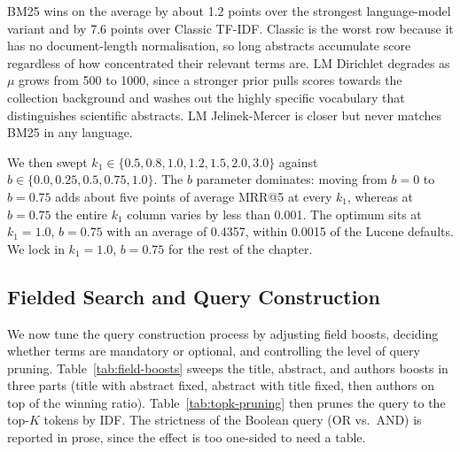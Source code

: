 BM25 wins on the average by about 1.2 points over the strongest language-model variant and by 7.6 points over Classic TF-IDF\@. Classic is the worst row because it has no document-length normalisation, so long abstracts accumulate score regardless of how concentrated their relevant terms are. LM Dirichlet degrades as $\mu$ grows from 500 to 1000, since a stronger prior pulls scores towards the collection background and washes out the highly specific vocabulary that distinguishes scientific abstracts. LM Jelinek-Mercer is closer but never matches BM25 in any language.

We then swept $k_1 \in \{0.5, 0.8, 1.0, 1.2, 1.5, 2.0, 3.0\}$ against $b \in \{0.0, 0.25, 0.5, 0.75, 1.0\}$. The $b$ parameter dominates: moving from $b{=}0$ to $b{=}0.75$ adds about five points of average MRR@5 at every $k_1$, whereas at $b{=}0.75$ the entire $k_1$ column varies by less than 0.001. The optimum sits at $k_1{=}1.0$, $b{=}0.75$ with an average of 0.4357, within 0.0015 of the Lucene defaults. We lock in $k_1{=}1.0$, $b{=}0.75$ for the rest of the chapter.

\subsection{Fielded Search and Query Construction}
\label{subsec:res-fielded}

We now tune the query construction process by adjusting field boosts, deciding whether terms are mandatory or optional, and controlling the level of query pruning. Table~\ref{tab:field-boosts} sweeps the title, abstract, and authors boosts in three parts (title with abstract fixed, abstract with title fixed, then authors on top of the winning ratio). Table~\ref{tab:topk-pruning} then prunes the query to the top-$K$ tokens by IDF\@. The strictness of the Boolean query (OR vs.\ AND) is reported in prose, since the effect is too one-sided to need a table.

